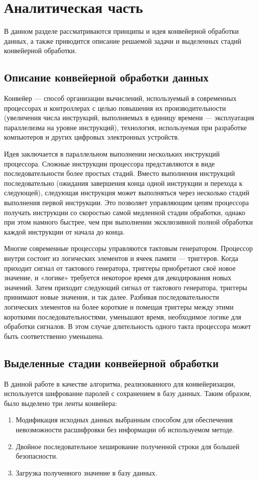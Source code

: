 \documentclass[a4paper,oneside,14pt]{extreport}
\begin{document}
\chapter{Аналитическая часть}	
В данном разделе рассматриваются принципы и идея конвейерной обработки данных, а также приводится описание решаемой задачи и выделенных стадий конвейерной обработки.
	
\section{Описание конвейерной обработки данных}
Конвейер\cite{conveyor} — способ организации вычислений, используемый в современных процессорах и контроллерах с целью повышения их производительности (увеличения числа инструкций, выполняемых в единицу времени — эксплуатация параллелизма на уровне инструкций), технология, используемая при разработке компьютеров и других цифровых электронных устройств.

Идея заключается в параллельном выполнении нескольких инструкций процессора. Сложные инструкции процессора представляются в виде последовательности более простых стадий. Вместо выполнения инструкций последовательно (ожидания завершения конца одной инструкции и перехода к следующей), следующая инструкция может выполняться через несколько стадий выполнения первой инструкции. Это позволяет управляющим цепям процессора получать инструкции со скоростью самой медленной стадии обработки, однако при этом намного быстрее, чем при выполнении эксклюзивной полной обработки каждой инструкции от начала до конца.

Многие современные процессоры управляются тактовым генератором. Процессор внутри состоит из логических элементов и ячеек памяти — триггеров. Когда приходит сигнал от тактового генератора, триггеры приобретают своё новое значение, и «логике» требуется некоторое время для декодирования новых значений. Затем приходит следующий сигнал от тактового генератора, триггеры принимают новые значения, и так далее. Разбивая последовательности логических элементов на более короткие и помещая триггеры между этими короткими последовательностями, уменьшают время, необходимое логике для обработки сигналов. В этом случае длительность одного такта процессора может быть соответственно уменьшена.

\section{Выделенные стадии конвейерной обработки}
В данной работе в качестве алгоритма, реализованного для конвейеризации, используется шифрование паролей с сохранением в базу данных. Таким образом, было выделено три ленты конвейера:
\begin{enumerate}
	\item Модификация исходных данных выбранным способом для обеспечения невозможности расшифровки без информации об используемом методе.
	\item Двойное последовательное хеширование полученной строки для большей безопасности.
	\item Загрузка полученного значение в базу данных.
\end{enumerate}
\end{document}
